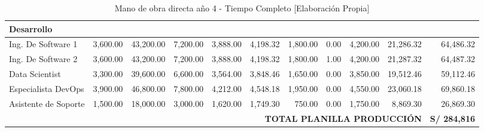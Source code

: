 \begin{table}[H]
\centering
\scriptsize
\renewcommand{\arraystretch}{1.15}
\setlength{\tabcolsep}{3pt}
\begin{tabular}{|l|r|r|r|r|r|r|r|r|r|r|}
\hline
\multicolumn{11}{|l|}{\textbf{Desarrollo}} \\ \hline
Ing. De Software 1 & 3,600.00 & 43,200.00 & 7,200.00 & 3,888.00 & 4,198.32 & 1,800.00 & 0.00 & 4,200.00 & 21,286.32 & 64,486.32 \\ \hline
Ing. De Software 2 & 3,600.00 & 43,200.00 & 7,200.00 & 3,888.00 & 4,198.32 & 1,800.00 & 1.00 & 4,200.00 & 21,287.32 & 64,487.32 \\ \hline
Data Scientist & 3,300.00 & 39,600.00 & 6,600.00 & 3,564.00 & 3,848.46 & 1,650.00 & 0.00 & 3,850.00 & 19,512.46 & 59,112.46 \\ \hline
Especialista DevOps & 3,900.00 & 46,800.00 & 7,800.00 & 4,212.00 & 4,548.18 & 1,950.00 & 0.00 & 4,550.00 & 23,060.18 & 69,860.18 \\ \hline
Asistente de Soporte & 1,500.00 & 18,000.00 & 3,000.00 & 1,620.00 & 1,749.30 & 750.00 & 0.00 & 1,750.00 & 8,869.30 & 26,869.30 \\ \hline
\multicolumn{10}{|r|}{\textbf{TOTAL PLANILLA PRODUCCIÓN}} & \textbf{S/ 284,816} \\ \hline
\end{tabular}
\caption{Mano de obra directa año 4 - Tiempo Completo [Elaboración Propia]}
\label{fig:mano-obra-directa-anio4}
\end{table}